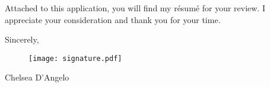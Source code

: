 \documentclass[a4paper,10pt]{article}
\begin{document}
\vspace{5mm} %


\vspace{2mm}

Attached to this application, you will find my r\'{e}sum\'{e} for your review. I appreciate your consideration and thank you for your time.
  
  \vspace{6mm}
  
  Sincerely, \\ \vspace{-4mm}
  
  \begin{figure}[h!]
 \hspace{.7in} \texttt{[image: signature.pdf]}
  \end{figure}
  
  Chelsea D'Angelo
  
  \endgroup
\end{document}
